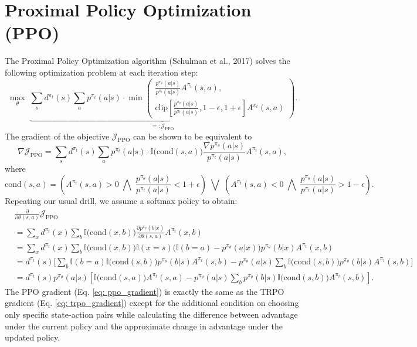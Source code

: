 \documentclass[a4paper, 10pt]{article}
\begin{document}
\section{Proximal Policy Optimization (PPO)}
The Proximal Policy Optimization algorithm (Schulman et al., 2017) solves the following optimization problem at each iteration step:
\begin{equation}
  \max_\theta \; \underbrace{\sum_s d^{\pi_t}(s) \sum_a p^{\pi_t}(a | s) \cdot \min \left( \begin{matrix} \frac{p^{\pi_\theta}(a | s)}{p^{\pi_t}(a | s)} A^{\pi_t}(s, a), \\ \text{clip} \left[\frac{p^{\pi_\theta}(a | s)}{p^{\pi_t}(a | s)}, 1 - \epsilon, 1 + \epsilon \right] A^{\pi_t}(s, a) \end{matrix} \right)}_{=: \mathcal{J}_{\text{PPO}}}.
\end{equation}
The gradient of the objective $\mathcal{J}_{\text{PPO}}$ can be shown to be equivalent to
\begin{equation}
  \nabla \mathcal{J}_{\text{PPO}} = \sum_s d^{\pi_t}(s) \sum_a p^{\pi_t}(a | s) \cdot \mathbb{I} \Big( \text{cond}(s, a) \Big) \frac{\nabla p^{\pi_\theta}(a | s)}{p^{\pi_t}(a | s)} A^{\pi_t}(s, a),
\end{equation}
where 
\begin{equation}
  \text{cond}(s, a) = \left( A^{\pi_t}(s, a) > 0 \;\bigwedge\; \frac{p^{\pi_\theta}(a | s)}{p^{\pi_t}(a | s)} < 1 + \epsilon \right) \;\bigvee\; \left( A^{\pi_t}(s, a) < 0 \;\bigwedge\; \frac{p^{\pi_\theta}(a | s)}{p^{\pi_t}(a | s)} > 1 - \epsilon \right).
\end{equation}
Repeating our usual drill, we assume a softmax policy to obtain:
\begin{align}
  & \frac{\partial}{\partial \theta(s, a)} \mathcal{J}_{\text{PPO}} \nonumber \\
  &= \sum_x d^{\pi_t}(x) \sum_b \mathbb{I} \Big( \text{cond}(x, b) \Big) \frac{\partial p^{\pi_\theta}(b | x)}{\partial \theta(s, a)} A^{\pi_t}(x, b) \nonumber \\
  &= \sum_x d^{\pi_t}(x) \sum_b \mathbb{I} \Big( \text{cond}(x, b) \Big) \mathbb{I}(x = s) \Big( \mathbb{I}(b = a) - p^{\pi_\theta}(a | x) \Big) p^{\pi_\theta}(b | x) A^{\pi_t}(x, b) \nonumber \\
  &= d^{\pi_t}(s) \Bigg[ \sum_b \mathbb{I}(b = a) \mathbb{I} \Big( \text{cond}(s, b) \Big) p^{\pi_\theta}(b | s) A^{\pi_t}(s, b) - p^{\pi_\theta}(a | s) \sum_b \mathbb{I} \Big( \text{cond}(s, b) \Big) p^{\pi_\theta}(b | s) A^{\pi_t}(s, b) \Bigg] \nonumber \\
    &= d^{\pi_t}(s) p^{\pi_\theta}(a | s) \left[ \mathbb{I} \Big( \text{cond}(s, a) \Big) A^{\pi_t}(s, a) - p^{\pi_\theta}(a | s) \sum_b p^{\pi_\theta}(b | s) \mathbb{I} \Big( \text{cond}(s, b) \Big) A^{\pi_t}(s, b) \right]. \label{eq: ppo_gradient}
\end{align}
The PPO gradient (Eq. \ref{eq: ppo_gradient}) is exactly the same as the TRPO gradient (Eq. \ref{eq: trpo_gradient}) except for the additional condition on choosing only specific state-action pairs while calculating the difference between advantage under the current policy and the approximate change in advantage under the updated policy.
\end{document}
